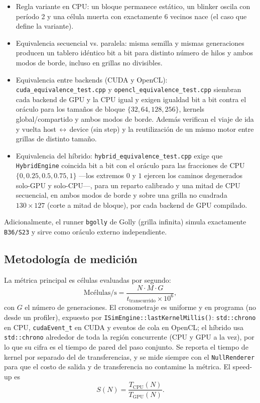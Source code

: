 \documentclass[
	spanish,
	letterpaper, oneside
]{article}
\begin{document}
\begin{itemize}
	\item Regla variante en CPU: un bloque permanece estático, un
	      blinker oscila con período 2 y una célula muerta con exactamente
	      $6$ vecinos nace (el caso que define la variante).
	\item Equivalencia secuencial vs. paralela: misma semilla y
	      mismas generaciones producen un tablero idéntico bit a bit para distinto
	      número de hilos y ambos modos de borde, incluso en grillas no divisibles.
	\item Equivalencia entre backends (CUDA y OpenCL):
	      \texttt{cuda\_equivalence\_test.cpp} y \texttt{opencl\_equivalence\_test.cpp}
	      siembran cada backend de GPU y la CPU igual y exigen igualdad bit a bit
	      contra el oráculo para los tamaños de bloque $\{32,64,128,256\}$, kernels
	      global/compartido y ambos modos de borde. Además verifican el viaje de ida
	      y vuelta host\,$\leftrightarrow$\,device (sin step) y
	      la reutilización de un mismo motor entre grillas de distinto tamaño.
		\item Equivalencia del híbrido: \texttt{hybrid\_equivalence\_test.cpp}
		      exige que \texttt{HybridEngine} coincida bit a bit con el oráculo para las
		      fracciones de CPU $\{0,0.25,0.5,0.75,1\}$ ---los extremos $0$ y $1$ ejercen
		      los caminos degenerados solo-GPU y solo-CPU---, para un reparto calibrado y
		      una mitad de CPU secuencial, en ambos modos de borde y sobre una grilla no
		      cuadrada $130\times127$ (corte a mitad de bloque), por cada backend de GPU
		      compilado.
\end{itemize}

Adicionalmente, el runner \texttt{bgolly} de Golly (grilla infinita) simula
exactamente \texttt{B36/S23} y sirve como oráculo externo independiente.

\subsection{Metodología de medición}
\label{sec:metodologia}

La métrica principal es células evaluadas por segundo:
%
\begin{equation}
	\text{Mcélulas/s} =
	\frac{N \cdot M \cdot G}{t_{\text{transcurrido}} \times 10^{6}},
	\label{eq:metrica}
\end{equation}
%
con $G$ el número de generaciones. El cronometraje es uniforme y en programa (no
desde un profiler), expuesto por \texttt{ISimEngine::lastKernelMillis()}:
\texttt{std::chrono} en CPU, \texttt{cudaEvent\_t} en CUDA y eventos de cola en
OpenCL; el híbrido usa \texttt{std::chrono} alrededor de toda la región concurrente
(CPU y GPU a la vez), por lo que su cifra es el tiempo de pared del paso conjunto.
Se reporta el tiempo de kernel por separado del de transferencias, y se
mide siempre con el \texttt{NullRenderer} para que el costo de salida y de
transferencia no contamine la métrica. El speed-up es
%
\begin{equation}
	S(N) = \frac{T_{\text{CPU}}(N)}{T_{\text{GPU}}(N)}.
	\label{eq:speedup}
\end{equation}
\end{document}
